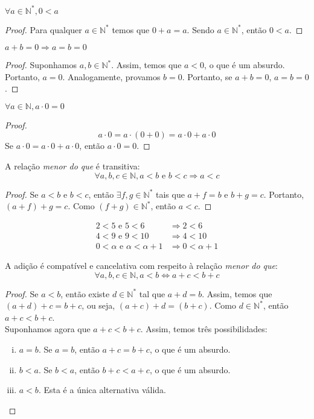 \begin{prop}
$\forall a \in \mathbb{N}^*,0<a$
\begin{proof}
Para qualquer $a \in \mathbb{N}^*$ temos que $0+a=a$. Sendo $a \in \mathbb{N}^*$, então $0<a$.
\end{proof}\end{prop}

\begin{prop}
$a+b=0 \Rightarrow a=b=0$
\begin{proof}
Suponhamos $a,b\in \mathbb{N}^*$. Assim, temos que $a<0$, o que é um absurdo. Portanto, $a=0$. Analogamente, provamos $b=0$. Portanto, se $a+b=0$, $a=b=0$.
\end{proof}\end{prop}

\begin{prop}
$\forall a \in \mathbb{N}, a\cdot 0 = 0$
\begin{proof}
\[a\cdot 0 = a \cdot (0+0) = a\cdot 0 + a\cdot 0\]
Se $a\cdot 0 = a\cdot 0 + a\cdot 0$, então $a\cdot 0 = 0$.
\end{proof}\end{prop}

\begin{prop}
A relação \emph{menor do que} é transitiva:
\[\forall a,b,c \in \mathbb{N}, a<b \textrm{ e }b<c \Rightarrow a<c\]
\begin{proof}
Se $a<b$ e $b<c$, então $\exists f ,g \in \mathbb{N}^*$ tais que $a+f=b$ e $b+g=c$. Portanto, $(a+f)+g=c$. Como $(f+g) \in \mathbb{N}^*$, então $a<c$.
\end{proof}\end{prop}
\begin{exemplo}
\begin{align*}
2<5 \textrm{ e } 5<6 &\Rightarrow 2<6 \\
4<9 \textrm{ e } 9<10 &\Rightarrow 4<10 \\
0<\alpha \textrm{ e } \alpha<\alpha+1 &\Rightarrow 0<\alpha+1
\end{align*}
\end{exemplo}

\begin{prop}
A adição é compatível e cancelativa com respeito à relação \emph{menor do que}:
\[\forall a,b,c \in \mathbb{N}, a<b \Leftrightarrow a+c<b+c\]
\begin{proof}
Se $a<b$, então existe $d\in \mathbb{N}^*$ tal que $a+d=b$. Assim, temos que $(a+d)+c=b+c$, ou seja, $(a+c)+d=(b+c)$. Como $d\in \mathbb{N}^*$, então $a+c<b+c$.\\ Suponhamos agora que $a+c<b+c$. Assim, temos três possibilidades:
\begin{enumerate}[(i)]
\item $a=b$. Se $a=b$, então $a+c=b+c$, o que é um absurdo.
\item $b<a$. Se $b<a$, então $b+c<a+c$, o que é um absurdo.
\item $a<b$. Esta é a única alternativa válida.
\end{enumerate}\end{proof}\end{prop}

